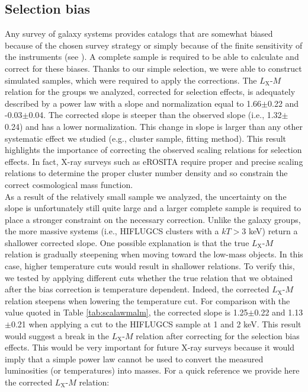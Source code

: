 \documentclass{aa} %
\begin{document}
\subsection{Selection bias}
Any survey of galaxy systems provides catalogs that are somewhat
biased because of the chosen survey strategy or simply because of the
finite sensitivity of the instruments (see
\citealt{2013SSRv..177..247G}).  A complete sample is required to be
able to calculate and correct for these biases. Thanks to our simple
selection, we were able to construct simulated samples, which were required
to apply the corrections. The $L_{\text{X}}$-$M$ relation for the
groups we analyzed, corrected for selection effects, is adequately described by a power
law with a slope and normalization equal to 1.66$\pm$0.22 and
-0.03$\pm$0.04. The corrected slope is steeper than the
observed slope (i.e.,  1.32$\pm$0.24) and has a lower normalization. This change in slope is larger than any other systematic effect we studied (e.g., cluster sample, fitting method). This result highlights the importance of correcting the observed scaling relations for selection effects. In fact, X-ray surveys such as eROSITA require proper and precise scaling relations to determine the proper cluster number density and so constrain the correct cosmological mass function.\\ 
As a result of  the
relatively small sample we analyzed, the uncertainty on the slope is unfortunately still quite
large and a larger complete sample is required to place a stronger
constraint on the necessary correction. Unlike the galaxy groups, the more massive systems (i.e., HIFLUGCS clusters with a $kT>3$ keV) return a shallower corrected slope. One possible explanation is that the true $L_{\text{X}}$-$M$ relation is gradually steepening when moving toward the low-mass objects. In this case, higher temperature cuts would result in shallower relations.  
To verify this, we tested  by applying different cuts whether the true relation that we obtained after the bias correction is temperature dependent. Indeed, the corrected $L_{\text{X}}$-$M$ relation steepens when lowering the temperature cut. For comparison with the value quoted in Table \ref{tab:scalawmalm}, the corrected slope is 1.25$\pm$0.22 and 1.13$\pm$0.21 when applying a cut to the HIFLUGCS sample at 1 and 2 keV. 
This result would suggest a break in the $L_{\text{X}}$-$M$ relation after correcting for the selection bias effects. This would be very important for future X-ray surveys because it would imply that a simple power law cannot be used to convert the measured luminosities (or temperatures) into masses. For a quick reference we provide here the corrected  $L_{\text{X}}$-$M$ relation:
\end{document}
